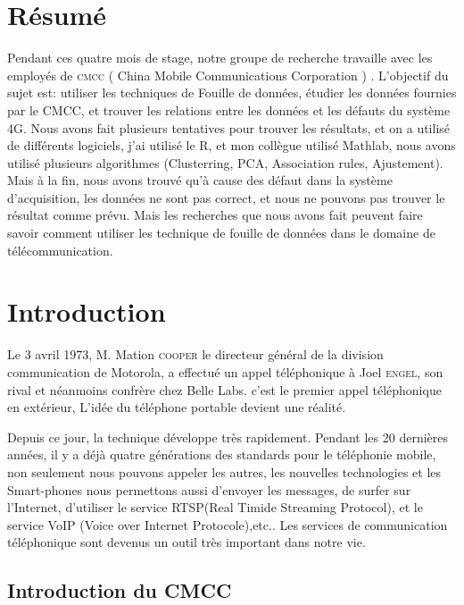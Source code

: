 
\section{Résumé} 

Pendant ces quatre mois de stage, notre groupe de recherche travaille avec les employés de \textsc{cmcc} ( China Mobile Communications Corporation ) . L'objectif du sujet est: utiliser les techniques de Fouille de données, étudier les données fournies par le CMCC, et trouver les relations entre les données et les défauts du système 4G. Nous avons fait plusieurs tentatives pour trouver les résultats, et on a utilisé de différents logiciels, j'ai utilisé le R, et mon collègue utilisé Mathlab, nous avons utilisé plusieurs algorithmes (Clusterring, PCA, Association rules, Ajustement). Mais à la fin,  nous avons trouvé qu'à cause des défaut dans la système d'acquisition, les données ne sont pas correct, et nous ne pouvons pas trouver le résultat comme prévu. Mais les recherches que nous avons fait peuvent faire savoir comment utiliser les technique de fouille de données dans le domaine de télécommunication.

\section{Introduction} 
 
Le 3 avril 1973, M. Mation \textsc{cooper} le directeur général de la division communication de Motorola, a effectué un appel téléphonique à Joel \textsc{engel}, son rival et néanmoins confrère chez \textsf{Belle Labs}. c'est le premier appel téléphonique en extérieur, L'idée du téléphone portable devient une réalité. 

Depuis ce jour, la technique développe très rapidement. Pendant les 20 dernières années, il y a déjà quatre générations des standards pour le téléphonie mobile, non seulement nous pouvons appeler les autres, les nouvelles technologies et les Smart-phones nous permettons aussi d'envoyer les messages, de surfer sur l'Internet, d'utiliser le service RTSP(Real Timide Streaming Protocol), et le service VoIP (Voice over Internet Protocole),etc.. Les services de communication téléphonique sont devenus un outil très important dans notre vie.
 
 \subsection{Introduction du CMCC}
 
